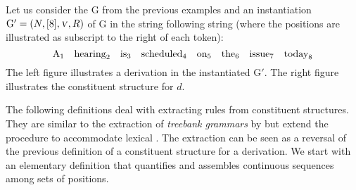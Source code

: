 \documentclass[../../document.tex]{subfiles}
\begin{document}
    \begin{example}\label{ex:lcfrs:instance}\NoEndMark
        Let us consider the  \(\mathrm{G}\) from the previous examples and an instantiation \(\mathrm{G'} = (N, [8], \textsc{\textsl{v}}, R)\) of \(\mathrm{G}\) in the string following string (where the positions are illustrated as subscript to the right of each token): \[
            \text{A}_1 \quad \text{hearing}_2 \quad \text{is}_3 \quad \text{scheduled}_4 \quad \text{on}_5 \quad \text{the}_6 \quad \text{issue}_7 \quad \text{today}_8
        \]
        The left figure illustrates a derivation in the instantiated  \(\mathrm{G'}\).
        The right figure illustrates the constituent structure for \(d\).
    
        \null\hfill
        \hfill
        \hfill\exampleqed
    \end{example}

    The following definitions deal with extracting  rules from constituent structures.
    They are similar to the extraction of \emph{treebank grammars} by \citet{MaierSogaard08} but extend the procedure to accommodate lexical .
    The extraction can be seen as a reversal of the previous definition of a constituent structure for a derivation.
    We start with an elementary definition that quantifies and assembles continuous sequences among sets of positions.
\end{document}

